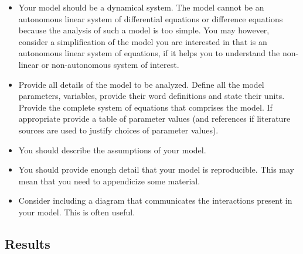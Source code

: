 \documentclass[]{book}
\providecommand{\tightlist}{%
  \setlength{\itemsep}{0pt}\setlength{\parskip}{0pt}}
\begin{document}
\begin{itemize}
\tightlist
\item
  Your model should be a dynamical system. The model cannot be an
  autonomous linear system of differential equations or difference
  equations because the analysis of such a model is too simple. You may
  however, consider a simplification of the model you are interested in
  that is an autonomous linear system of equations, if it helps you to
  understand the non-linear or non-autonomous system of interest.
\item
  Provide all details of the model to be analyzed. Define all the model
  parameters, variables, provide their word definitions and state their
  units. Provide the complete system of equations that comprises the
  model. If appropriate provide a table of parameter values (and
  references if literature sources are used to justify choices of
  parameter values).
\item
  You should describe the assumptions of your model.
\item
  You should provide enough detail that your model is reproducible. This
  may mean that you need to appendicize some material.
\item
  Consider including a diagram that communicates the interactions
  present in your model. This is often useful.
\end{itemize}

\subsection{Results}\label{results}
\end{document}
